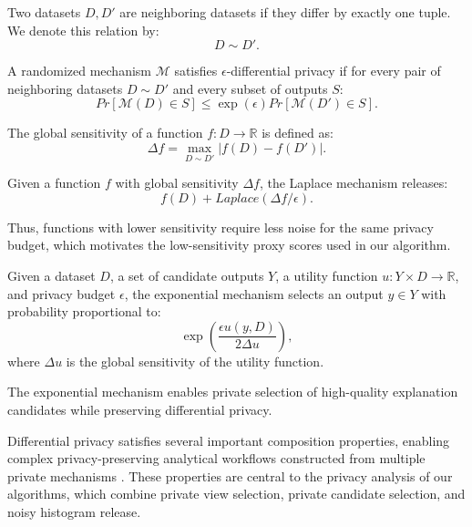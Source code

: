 \begin{definition}
Two datasets $D,D'$ are neighboring datasets if they differ by exactly one tuple.
We denote this relation by:
\[
D\sim D'.
\]
\end{definition}

\begin{definition}
A randomized mechanism $\mathcal{M}$ satisfies $\epsilon$-differential privacy if for
every pair of neighboring datasets $D\sim D'$ and every subset of outputs $S$:
\[
Pr[\mathcal{M}(D)\in S]
\leq
\exp(\epsilon)
Pr[\mathcal{M}(D')\in S].
\]
\end{definition}

\begin{definition}
The global sensitivity of a function $f:D\rightarrow\mathbb{R}$ is defined as:
\[
\Delta f
=
\max_{D\sim D'}
|f(D)-f(D')|.
\]
\end{definition}

\begin{definition}
Given a function $f$ with global sensitivity $\Delta f$, the Laplace mechanism releases:
\[
f(D)+Laplace(\Delta f/\epsilon).
\]
\end{definition}

Thus, functions with lower sensitivity require less noise for the same
privacy budget, which motivates the low-sensitivity proxy scores used in
our algorithm.

\begin{definition}
Given a dataset $D$, a set of candidate outputs $Y$, a utility function
$u:Y\times D\rightarrow\mathbb{R}$, and privacy budget $\epsilon$, the exponential
mechanism selects an output $y\in Y$ with probability proportional to:
\[
\exp\left(
\frac{\epsilon u(y,D)}
{2\Delta u}
\right),
\]
where $\Delta u$ is the global sensitivity of the utility function.
\end{definition}

The exponential mechanism enables private selection of high-quality explanation
candidates while preserving differential privacy.


Differential privacy satisfies several important composition properties, enabling
complex privacy-preserving analytical workflows constructed from multiple private
mechanisms \cite{mcsherry2009,li2016,bun2016}.
These properties are central to the privacy analysis of our algorithms, which combine
private view selection, private candidate selection, and noisy histogram release.

